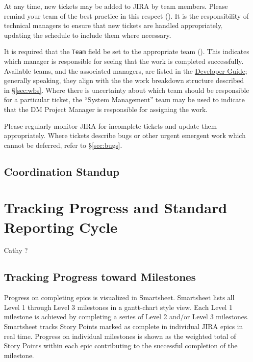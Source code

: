 At any time, new tickets may be added to \gls{JIRA} by team members.
Please remind your team of the best practice in this respect ().
It is the responsibility of technical managers to ensure that new tickets are handled appropriately, updating the schedule to include them where necessary.

It is required that the \texttt{Team} field be set to the appropriate team ().
This indicates which manager is responsible for \gls{seeing} that the work is completed successfully.
Available teams, and the associated managers, are listed in the \href{https://developer.lsst.io/processes/jira_agile.html}{Developer Guide}; generally speaking, they align with the the work breakdown structure described in \S\ref{sec:wbs}.
Where there is uncertainty about which team should be responsible for a particular ticket, the “System Management” team may be used to indicate that the \gls{DM} \gls{Project Manager} is responsible for assigning the work.

Please regularly monitor \gls{JIRA} for incomplete tickets and update them appropriately.
Where tickets describe bugs or other urgent emergent work which cannot be deferred, refer to \S\ref{sec:bugs}.

\subsection{Coordination Standup}
\label{sec:sup}

\section{Tracking Progress and Standard Reporting Cycle}
\label{sec:reporting-cycle}
 Cathy ?

\subsection{Tracking Progress toward Milestones}

Progress on completing epics is visualized in Smartsheet.
Smartsheet lists all Level 1 through Level 3 milestones in a gantt-chart style view.
Each Level 1 milestone is achieved by completing a series of Level 2 and/or Level 3 milestones.
Smartsheet tracks Story Points marked as complete in individual \gls{JIRA} epics in real time.
Progress on individual milestones is shown as the weighted total of Story Points within each epic contributing to the successful completion of the milestone.

